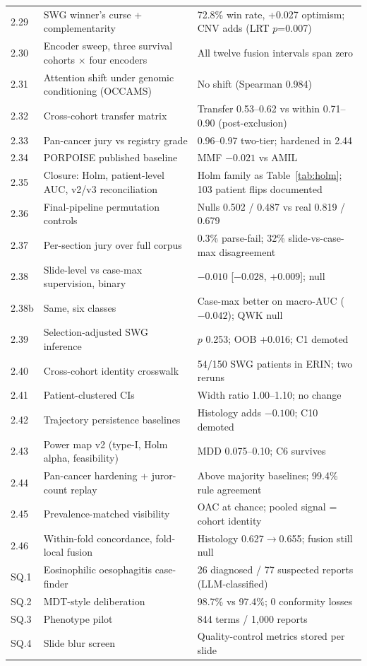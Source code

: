 \begin{small}
\begin{longtable}{@{}p{1.2cm}p{6.6cm}p{6.4cm}@{}}
2.29 & SWG winner's curse + complementarity & 72.8\% win rate, +0.027 optimism; CNV adds (LRT $p$=0.007) \\
2.30 & Encoder sweep, three survival cohorts $\times$ four encoders & All twelve fusion intervals span zero \\
2.31 & Attention shift under genomic conditioning (OCCAMS) & No shift (Spearman 0.984) \\
2.32 & Cross-cohort transfer matrix & Transfer 0.53--0.62 vs within 0.71--0.90 (post-exclusion) \\
2.33 & Pan-cancer jury vs registry grade & 0.96--0.97 two-tier; hardened in 2.44 \\
2.34 & PORPOISE published baseline & MMF $-0.021$ vs AMIL \\
2.35 & Closure: Holm, patient-level AUC, v2/v3 reconciliation & Holm family as Table~\ref{tab:holm}; 103 patient flips documented \\
2.36 & Final-pipeline permutation controls & Nulls 0.502 / 0.487 vs real 0.819 / 0.679 \\
2.37 & Per-section jury over full corpus & 0.3\% parse-fail; 32\% slide-vs-case-max disagreement \\
2.38 & Slide-level vs case-max supervision, binary & $-0.010$ [$-0.028$, +0.009]; null \\
2.38b & Same, six classes & Case-max better on macro-AUC ($-0.042$); QWK null \\
2.39 & Selection-adjusted SWG inference & $p$ 0.253; OOB +0.016; C1 demoted \\
2.40 & Cross-cohort identity crosswalk & 54/150 SWG patients in ERIN; two reruns \\
2.41 & Patient-clustered CIs & Width ratio 1.00--1.10; no change \\
2.42 & Trajectory persistence baselines & Histology adds $-0.100$; C10 demoted \\
2.43 & Power map v2 (type-I, Holm alpha, feasibility) & MDD 0.075--0.10; C6 survives \\
2.44 & Pan-cancer hardening + juror-count replay & Above majority baselines; 99.4\% rule agreement \\
2.45 & Prevalence-matched visibility & OAC at chance; pooled signal = cohort identity \\
2.46 & Within-fold concordance, fold-local fusion & Histology 0.627$\to$0.655; fusion still null \\
SQ.1 & Eosinophilic oesophagitis case-finder & 26 diagnosed / 77 suspected reports (LLM-classified) \\
SQ.2 & MDT-style deliberation & 98.7\% vs 97.4\%; 0 conformity losses \\
SQ.3 & Phenotype pilot & 844 terms / 1,000 reports \\
SQ.4 & Slide blur screen & Quality-control metrics stored per slide \\
\bottomrule
\end{longtable}
\end{small}

